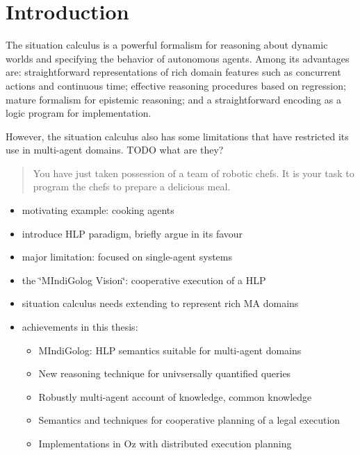 


\chapter{Introduction}

The situation calculus is a powerful formalism for reasoning about
dynamic worlds and specifying the behavior of autonomous agents. Among
its advantages are: straightforward representations of rich domain
features such as concurrent actions and continuous time; effective
reasoning procedures based on regression; mature formalism for epistemic
reasoning; and a straightforward encoding as a logic program for implementation.

However, the situation calculus also has some limitations that have
restricted its use in multi-agent domains. TODO what are they?

\begin{quote}
You have just taken possession of a team of robotic chefs. It is your
task to program the chefs to prepare a delicious meal. 
\end{quote}
\begin{itemize}
\item motivating example: cooking agents 
\item introduce HLP paradigm, briefly argue in its favour 
\item major limitation: focused on single-agent systems 
\item the \char`\"{}MIndiGolog Vision\char`\"{}: cooperative execution of
a HLP 
\item situation calculus needs extending to represent rich MA domains 
\item achievements in this thesis:

\begin{itemize}
\item MIndiGolog: HLP semantics suitable for multi-agent domains 
\item New reasoning technique for univsersally quantified queries 
\item Robustly multi-agent account of knowledge, common knowledge 
\item Semantics and techniques for cooperative planning of a legal execution 
\item Implementations in Oz with distributed execution planning 
\end{itemize}
\end{itemize}
